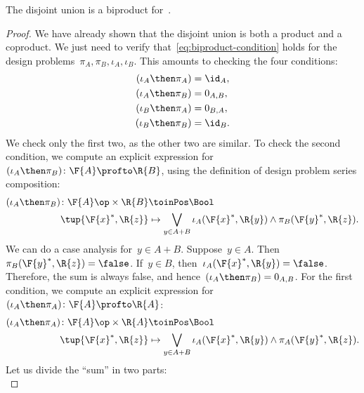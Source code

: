 \begin{lemma}
	The disjoint union is a biproduct for~\DP.
\end{lemma}
\begin{proof}
	We have already shown that the disjoint union is both a product and a coproduct.
	We just need to verify that~\cref{eq:biproduct-condition} holds for the design problems~$\pi_A, \pi_B, \iota_A, \iota_B$.
	This amounts to checking the four conditions:
	\begin{equation}
		\begin{aligned}
			(\iota_A\then \pi_A)
			                     & = \id_{A}, \\
			(\iota_A\then \pi_B) & = 0_{A,B}, \\
			(\iota_B\then \pi_A) & = 0_{B,A}, \\
			(\iota_B\then \pi_B) & = \id_{B}.
		\end{aligned}
	\end{equation}
	We check only the first two, as the other two are similar.
	To check the second condition, we compute an explicit expression for~$(\iota_A\then \pi_B)\colon \F{A} \profto \R{B}$, using the definition of design problem series composition:
	\begin{equation}
		\begin{aligned}
			(\iota_A\then \pi_B)
			\colon  \F{A}\op\times \R{B} & \toinPos \Bool \\
			\tup{\F{x}^*, \R{z}}         & \mapsto
			\bigvee_{y \in A + B} \iota_A(\F{x}^*,\R{y}) \wedge \pi_B(\F{y}^*,\R{z}).
		\end{aligned}
	\end{equation}
	We can do a case analysis for~$y\in A+B$.
	Suppose~$y\in A$.
	Then~$\pi_B(\F{y}^*,\R{z}) = \false$.
	If~$y \in B$, then~$\iota_A(\F{x}^*,\R{y}) = \false$.
	Therefore, the sum is always false, and hence~$(\iota_A\then \pi_B) = 0_{A,B}$.
	For the first condition, we compute an explicit expression for~$(\iota_A\then \pi_A) \colon \F{A} \profto \R{A}$:
	\begin{equation}
		\begin{aligned}
			(\iota_A\then \pi_A)
			\colon  \F{A}\op\times \R{A} & \toinPos \Bool \\
			\tup{\F{x}^*, \R{z}}         & \mapsto
			\bigvee_{y \in A + B} \iota_A(\F{x}^*,\R{y}) \wedge \pi_A(\F{y}^*,\R{z}).
		\end{aligned}
	\end{equation}
	Let us divide the ``sum'' in two parts:
	\begin{equation}

\end{equation}
\end{proof}
